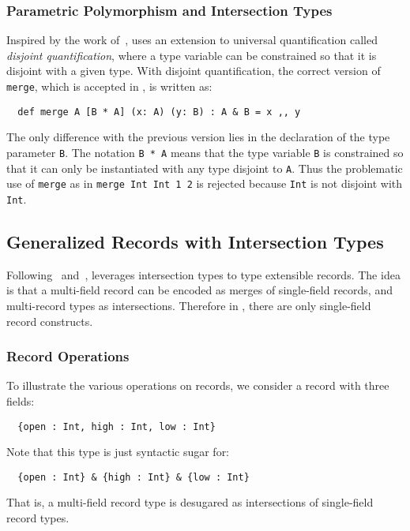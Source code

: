 \subsubsection{Parametric Polymorphism and Intersection Types}
\label{sec:polymorphism}

Inspired by the work of~\citet{alpuimdisjoint}, \name uses an extension to
universal quantification called \textit{disjoint quantification}, where a type
variable can be constrained so that it is disjoint with a given type. With
disjoint quantification, the correct version of \lstinline{merge}, which is
accepted in \name, is written as:
\begin{lstlisting}
  def merge A [B * A] (x: A) (y: B) : A & B = x ,, y
\end{lstlisting}

The only difference with the previous version lies in the declaration of the
type parameter \lstinline{B}. The notation \lstinline{B * A} means that the type
variable \lstinline{B} is constrained so that it can only be instantiated with
any type disjoint to \lstinline{A}. Thus the problematic use of
\lstinline{merge} as in \lstinline$merge Int Int 1 2$ is rejected because
\lstinline{Int} is not disjoint with \lstinline{Int}.


\subsection{Generalized Records with Intersection Types}
\label{sec:records}

Following~\citet{reynolds1997design} and~\citet{castagna1995calculus}, \name
leverages intersection types to type extensible records. The idea is that a
multi-field record can be encoded as merges of single-field records, and
multi-record types as intersections. Therefore in \name, there are only
single-field record constructs.

\subsubsection{Record Operations}

To illustrate the various operations on records, we consider a record with three
fields:
\begin{lstlisting}
  {open : Int, high : Int, low : Int}
\end{lstlisting}
Note that this type is just syntactic sugar for:
\begin{lstlisting}
  {open : Int} & {high : Int} & {low : Int}
\end{lstlisting}
That is, a multi-field record type is desugared as intersections of single-field
record types.

